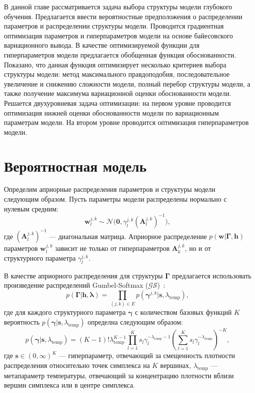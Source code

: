 В данной главе рассматривается задача выбора структуры модели глубокого обучения. Предлагается ввести вероятностные предположения о распределении параметров и распределении структуры модели. 
Проводится градиентная оптимизация параметров и гиперпараметров модели на основе байесовского вариационного вывода.  В качестве оптимизируемой функции для гиперпараметров модели предлагается обобщенная функция обоснованности. Показано, что данная функция оптимизирует несколько критериев выбора структуры модели: метод максимального правдоподобия, последовательное увеличение и снижению сложности модели, полный перебор структуры модели, а также получение максимума вариационной оценки обоснованности модели. Решается двухуровневая задача оптимизации: на первом уровне проводится оптимизация нижней оценки обоснованности модели по вариационным параметрам модели. На втором уровне проводится оптимизация гиперпараметров модели.

\section{Вероятностная модель}
Определим априорные распределения параметров и структуры модели следующим образом.
Пусть параметры модели распределены нормально с нулевым средним:
\[
    \mathbf{w}^{j,k}_l \sim \mathcal{N}\bigl(\mathbf{0}, \gamma^{j,k}_l(\mathbf{A}^{j,k}_l)^{-1}\bigr),
\]
где $ (\mathbf{A}^{j,k}_l)^{-1}$ --- диагональная матрица. Априорное распределение $p(\mathbf{w}|\boldsymbol{\Gamma}, \mathbf{h})$ параметров $\mathbf{w}^{j,k}_l$ зависит не только от гиперпараметров $\mathbf{A}_k^{j,k}$, но и от структурного параметра $\gamma^{j,k}_l$.


В качестве априорного распределения для структуры $\boldsymbol{\Gamma}$ предлагается использовать произведение распределений Gumbel-Softmax ($\mathcal{GS}$)~\cite{gs}:
\[
    p(\boldsymbol{\Gamma}|\mathbf{h},\boldsymbol{\lambda}) = \prod_{(j,k) \in E} p(\boldsymbol{\gamma}^{j,k}|\mathbf{s}, \lambda_\text{temp}),
\]
где для каждого структурного параметра $\boldsymbol{\gamma}$ с количеством базовых функций $K$ вероятность $p(\boldsymbol{\gamma}|\mathbf{s}, \lambda_\text{temp})$ определна следующим образом:
\[
    p(\boldsymbol{\gamma}|\mathbf{s}, \lambda_\text{temp}) = (K-1)!\lambda_{\text{temp}}^{K-1}\prod_{l=1}^K s_l\gamma_l^{-\lambda_\text{temp} -1} \left(\sum_{l=1}^K s_l\gamma_l^{-\lambda_\text{temp}}\right)^{-K},
\]
где $\mathbf{s} \in (0,\infty)^K$ --- гиперпараметр, отвечающий за смещенность плотности распределения относительно точек симплекса на $K$ вершинах, $\lambda_{\text{temp}}$ --- метапараметр температуры, отвечающий за концентрацию плотности вблизи вершин симплекса или в центре симплекса.

